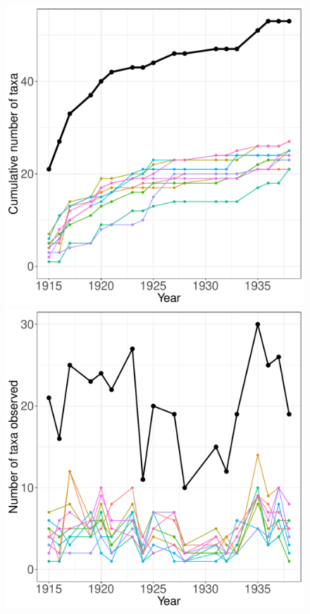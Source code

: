 \documentclass[11pt, oneside]{article}
\begin{document}
\begin{figure}[h!]
\centering
\includegraphics[scale = 0.4]{jrn-plants-compagnoni_species_accumulation_curve.pdf}
\includegraphics[scale = 0.4]{jrn-plants-compagnoni_num_taxa_over_time.pdf}

\end{figure}
\end{document}
